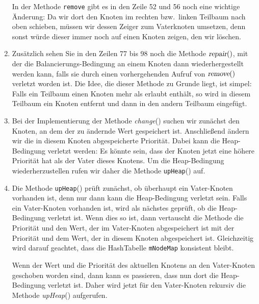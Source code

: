 \begin{enumerate}
      In der Methode \texttt{remove} gibt es in den Zeile 52 und 56 noch eine wichtige 
      Änderung: Da wir dort den Knoten im rechten bzw.~linken Teilbaum nach oben schieben,
      m\"ussen wir dessen Zeiger zum Vaterknoten umsetzen, denn sonst w\"urde dieser immer noch
      auf einen Knoten zeigen, den wir l\"oschen.
\item Zus\"atzlich sehen Sie in den Zeilen 77 bis 98 noch die Methode $\textsl{repair}()$,
      mit der die Balan\-cierungs-Bedingung an einem Knoten dann wiederhergestellt werden kann, 
      falls sie durch einen vorhergehenden Aufruf von $\textsl{remove}()$ verletzt worden ist.
      Die Idee, die dieser Methode zu Grunde liegt, ist simpel:  Falls ein Teilbaum einen Knoten
      mehr als erlaubt enth\"alt, so wird in diesem Teilbaum ein Knoten entfernt und dann in den
      andern Teilbaum eingef\"ugt.
\item Bei der Implementierung der Methode \textsl{change}() suchen wir zun\"achst
      den Knoten, an dem der zu \"andernde Wert gespeichert ist.  Anschlie{\ss}end
      \"andern wir die in diesem Knoten abgespeicherte Priorit\"at.  Dabei kann die
      Heap-Bedingung verletzt werden: Es k\"onnte sein, dass der Knoten jetzt eine h\"ohere
      Priorit\"at hat als der Vater dieses Knotens.  Um die Heap-Bedingung
      wiederherzustellen rufen wir daher die Methode \texttt{upHeap}() auf.
\item Die Methode \texttt{upHeap}() pr\"uft zun\"achst, ob \"uberhaupt ein Vater-Knoten
      vorhanden ist, denn nur dann kann die Heap-Bedingung verletzt sein.
      Falls ein Vater-Knoten vorhanden ist, wird als n\"achstes gepr\"uft, ob die 
      Heap-Bedingung verletzt ist.  Wenn dies so ist,
      dann vertauscht die Methode die Priorit\"at und den Wert, der im Vater-Knoten
      abgespeichert ist mit der Priorit\"at und dem Wert, der in diesem Knoten 
      abgespeichert ist.  Gleichzeitig wird darauf geachtet, dass die HashTabelle
      \texttt{mNodeMap} konsistent bleibt.
      
      Wenn der Wert und die Priorit\"at des aktuellen Knotens an den Vater-Knoten
      geschoben  worden sind, dann kann es passieren, dass nun dort die Heap-Bedingung
      verletzt ist.  Daher wird jetzt f\"ur den Vater-Knoten rekursiv die Methode
      \textsl{upHeap}() aufgerufen.
\end{enumerate}


